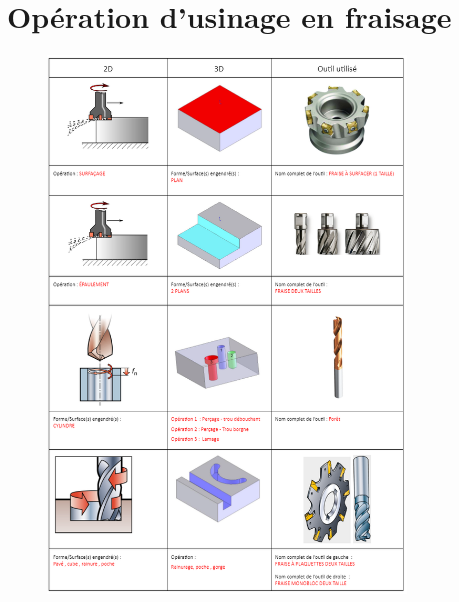 \documentclass[
	11pt, %
	fleqn, %
	a4paper, %
]{LegrandOrangeBook}
\begin{document}
\section{Opération d'usinage en fraisage}


\begin{figure}[H] %
	\centering %
	\includegraphics[width=0.85\textwidth]{Images/CORR1.png} %

	\label{fig:placeholder} %
\end{figure}
\end{document}
